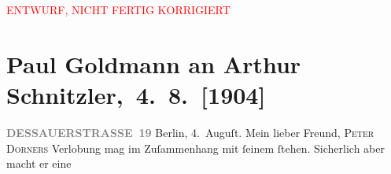 
\begin{center}
            \textcolor{red}{ENTWURF, NICHT FERTIG KORRIGIERT}
                      \end{center}
            
         
         \renewcommand{\erwaehntePersonen}{Personen: Eduard Bacher, Moriz Benedikt, Peter Dorner, Theodor Herzl, Hugo von Hofmannsthal,  Papst Pius X., Olga Schnitzler,  Wilhelm II. von Preußen, ?? [Vater von Peter Dorners Verlobter], ?? [Verlobte von Peter Dorner]}
         \renewcommand{\erwaehnteInstitutionen}{Institutionen: Neue Freie Presse}
         \renewcommand{\erwaehnteOrte}{Orte: Berlin, Dessauer Straße, Tirol, Welsberg-Taisten, Wien}
         \renewcommand{\erwaehnteWerke}{Werke: Tagebuch}
               \section[ Paul Goldmann an Arthur Schnitzler, 4. 8. {[}1904{]}]{ Paul Goldmann an Arthur Schnitzler, 4. 8. {[}1904{]}}\nopagebreak{}\rehead{ }\begin{ledgroupsized}[t]{13cm}\normalsize\beginnumbering \toendnotes[C]{\smallbreak\pagebreak[2]} 
\toendnotes[C]{\smallbreak}\pstart
           \noindent{}\raggedleft{}{\pb}\textcolor{gray}{\textbf{DESSAUERSTRASSE 19}}\pend
           \pstart
           Berlin, 4. Auguſt.\pend
           \pstart{}Mein lieber Freund,\pend\pstart
           \textsc{Peter Dorners} Verlobung mag im
               Zuſammenhang mit ſeinem \label{K_L03449-1v}\label{K_L03449-1h} ſtehen. Sicherlich aber macht er eine

\end{ledgroupsized}
